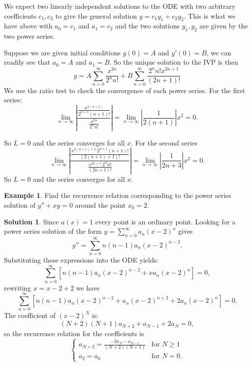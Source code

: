 \documentclass{article}
\theoremstyle{plain}
\theoremstyle{definition}
\newtheorem{exmp}{Example}[section]
\newtheorem*{sol}{Solution}
\numberwithin{equation}{section}
\begin{document}
\begin{tcolorbox}
        We expect two linearly independent solutions to the ODE with two arbitrary coefficients $c_1, c_2$ to give the general solution $y=c_1y_1 + c_2y_2$. This is what we have above with $a_0=c_1$ and $a_1=c_2$ and the two solutions $y_1,y_2$ are given by the two power series.

        Suppose we are given initial conditions $y(0)=A$ and $y'(0)=B$, we can readily see that $a_0=A$ and $a_1=B$. So the unique solution to the IVP is then 
        \[
        y = A \sum_{n=0}^{\infty} \frac{x^{2n}}{2^nn!} + B\sum_{n=0}^{\infty}\frac{2^nn!x^{2n+1}}{(2n+1)!}
        \]
        We use the ratio test to check the convergence of each power series. For the first series:
        \[
        \lim_{n\to \infty} \left\vert \frac{\frac{x^{2(n+1)}}{2^{n+1}(n+1)!}}{\frac{x^{2n}}{2^nn!}} \right\vert = \lim_{n\to \infty} \left \vert \frac{1}{2(n+1)} \right \vert x^2 = 0.
        \]
    
        So $L=0$ and the series converges for all $x$. For the second series
        \[
        \lim_{n\to \infty} \left\vert \frac{\frac{x^{2(n+1)+1} \ 2^{n+1}(n+1)!}{(2(n+1)+1)!}}{\frac{x^{2n+1}\ 2^nn!}{(2n+1)!}} \right\vert = \lim_{n\to \infty} \left \vert \frac{1}{2n+3} \right \vert x^2 = 0.
        \]
        So $L=0$ and the series converges for all $x$.
\end{tcolorbox}

\begin{tcolorbox}
    \begin{exmp}
        Find the recurrence relation corresponding to the power series solution of $y''+xy=0$ around the point $x_0=2$.
    \end{exmp}
    \begin{sol}
        Since $a(x)=1$ every point is an ordinary point. Looking for a power series solution of the form $y=\sum_{n=0}^{\infty} a_n(x-2)^n$ gives
        \[
        y''= \sum_{n=0}^{\infty} n(n-1)a_n(x-2)^{n-2}.
        \]
        Substituting these expressions into the ODE yields:
        \[
            \sum_{n=0}^{\infty} \left[ n(n-1)a_n(x-2)^{n-2} + xa_n(x-2)^n\right] = 0,
        \]
        rewriting $x=x-2+2$ we have
        \[
            \sum_{n=0}^{\infty} \left[ n(n-1)a_n(x-2)^{n-2} + a_n(x-2)^{n+2} + 2a_n(x-2)^n\right] = 0.
        \]
        The coefficient of $(x-2)^N$ is:
        \[
        (N+2)(N+1)a_{N+2} + a_{N-1} + 2a_N = 0,
        \]
        so the recurrence relation for the coefficients is
        \[
        \begin{cases}
            a_{N+2} = \frac{-2a_N - a_{N-1}}{(N+2)(N+1)} & \text{for } N \geq 1 \\
            a_2 = a_0 & \text{for } N=0.
        \end{cases}
        \]
    \end{sol}
\end{tcolorbox}
\end{document}
